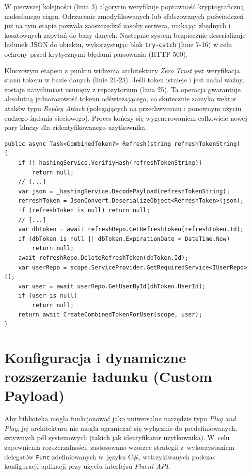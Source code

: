 \documentclass{SGGW-thesis}
\begin{document}
W pierwszej kolejności (linia 3) algorytm weryfikuje poprawność kryptograficzną nadesłanego ciągu. Odrzucenie zmodyfikowanych lub sfałszowanych poświadczeń już na tym etapie pozwala zaoszczędzić zasoby serwera, unikając zbędnych i kosztownych zapytań do bazy danych. Następnie system bezpiecznie deserializuje ładunek JSON do obiektu, wykorzystując blok \texttt{try-catch} (linie 7-16) w celu ochrony przed krytycznymi błędami parsowania (HTTP 500).

Kluczowym etapem z punktu widzenia architektury \textit{Zero Trust} jest weryfikacja stanu tokenu w bazie danych (linie 21-23). Jeśli token istnieje i jest nadal ważny, zostaje natychmiast usunięty z repozytorium (linia 25). Ta operacja gwarantuje absolutną jednorazowość tokenu odświeżającego, co skutecznie zamyka wektor ataków typu \textit{Replay Attack} (polegających na przechwyceniu i ponownym użyciu cudzego żądania sieciowego). Proces kończy się wygenerowaniem całkowicie nowej pary kluczy dla zidentyfikowanego użytkownika.

\begin{lstlisting}[caption={Weryfikacja bazy danych i odświeżanie tokenów rotacyjnych}, label={lst:refresh}]    
public async Task<CombinedToken?> Refresh(string refreshTokenString)
{
    if (!_hashingService.VerifiyHash(refreshTokenString))
        return null;
    // [...]
    var json = _hashingService.DecodePayload(refreshTokenString);
    refreshToken = JsonConvert.DeserializeObject<RefreshToken>(json);
    if (refreshToken is null) return null;
    // [...]
    var dbToken = await refreshRepo.GetRefreshToken(refreshToken.Id);
    if (dbToken is null || dbToken.ExpirationDate < DateTime.Now)
        return null;
    await refreshRepo.DeleteRefreshToken(dbToken.Id);
    var userRepo = scope.ServiceProvider.GetRequiredService<IUserRepo>();
    var user = await userRepo.GetUserById(dbToken.UserId);
    if (user is null)
        return null;
    return await CreateCombinedTokenForUser(scope, user);
}
\end{lstlisting}

\section{Konfiguracja i dynamiczne rozszerzanie ładunku (Custom Payload)}

Aby biblioteka mogła funkcjonować jako uniwersalne narzędzie typu \textit{Plug and Play}, jej architektura nie mogła ograniczać się wyłącznie do predefiniowanych, sztywnych pól systemowych (takich jak identyfikator użytkownika). W~celu zapewnienia rozszerzalności, zastosowano wzorzec strategii z~wykorzystaniem delegatów \texttt{Func} zdefiniowanych w~języku C\#, wstrzykiwanych podczas konfiguracji aplikacji przy użyciu interfejsu \textit{Fluent API}.
\end{document}
